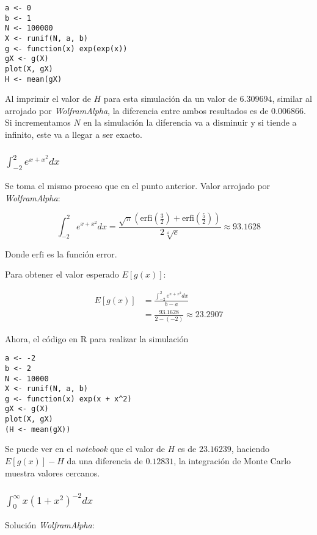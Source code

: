 \documentclass[12pt]{article}
\begin{document}
\begin{lstlisting}
a <- 0
b <- 1
N <- 100000
X <- runif(N, a, b)
g <- function(x) exp(exp(x))
gX <- g(X)
plot(X, gX)
H <- mean(gX)
\end{lstlisting}

Al imprimir el valor de $H$ para esta simulación da un valor de $6.309694$, similar al arrojado por \textit{WolframAlpha}, la diferencia entre ambos resultados es de $0.006866$. Si incrementamos $N$ en la simulación la diferencia va a disminuir y si tiende a infinito, este va a llegar a ser exacto.


\subsubsection{$\int_{-2}^{2} e^{x + x^{2}} dx$}

Se toma el mismo proceso que en el punto anterior. Valor arrojado por \textit{WolframAlpha}:

\[
\int_{-2}^{2} e^{x + x^{2}} dx = \frac{\sqrt{\pi} \left(\mathrm{erfi} \left(\frac{3}{2} \right) + \mathrm{erfi} \left(\frac{5}{2} \right) \right)  }{2 \sqrt[4]{e}} \approx 93.1628
\]

Donde $\mathrm{erfi}$ es la función error.

Para obtener el valor esperado $E[g(x)]$:

\begin{align*}
  E[g(x)] &= \frac{\int_{-2}^{2} e^{x + x^{2}} dx}{b - a}  \\
  &= \frac{93.1628}{2 - (-2)} \approx 23.2907
\end{align*}

Ahora, el código en \textsf{R} para realizar la simulación

\begin{lstlisting}
a <- -2
b <- 2
N <- 10000
X <- runif(N, a, b)
g <- function(x) exp(x + x^2)
gX <- g(X)
plot(X, gX)
(H <- mean(gX))
\end{lstlisting}

Se puede ver en el \textit{notebook} que el valor de $H$ es de $23.16239$, haciendo $E[g(x)] - H$ da una diferencia de $0.12831$, la integración de Monte Carlo muestra valores cercanos.

\subsubsection{$\int_{0}^{\infty} x(1 + x^{2})^{-2} dx$}

Solución \textit{WolframAlpha}:
\end{document}
